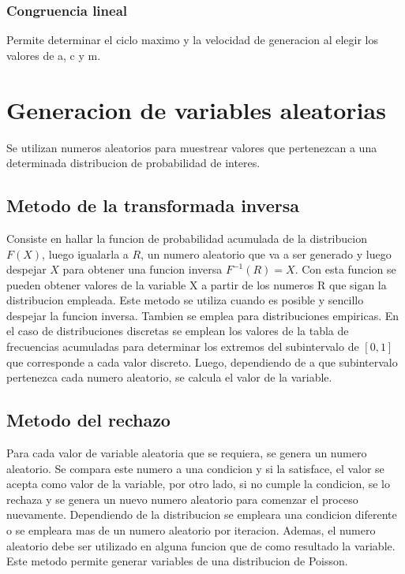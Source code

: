 \documentclass[a4paper]{article}
\begin{document}
\subsubsection*{Congruencia lineal} %
Permite determinar el ciclo maximo y la velocidad de generacion al elegir los valores de a, c y m.

\section{Generacion de variables aleatorias}
Se utilizan numeros aleatorios para muestrear valores que pertenezcan a una determinada distribucion de
probabilidad de interes.

\subsection*{Metodo de la transformada inversa}
Consiste en hallar la funcion de probabilidad acumulada de la distribucion $F(X)$, luego igualarla a $R$,
un numero aleatorio que va a ser generado y luego despejar $X$ para obtener una funcion inversa $F^{-1}(R) = X$.
Con esta funcion se pueden obtener valores de la variable X a partir de los numeros R que sigan la distribucion 
empleada. 
Este metodo se utiliza cuando es posible y sencillo despejar la funcion inversa. Tambien se emplea para distribuciones
empiricas.
En el caso de distribuciones discretas se emplean los valores de la tabla de frecuencias acumuladas para determinar 
los extremos del subintervalo de $[0,1]$ que corresponde a cada valor discreto. Luego, dependiendo de a que subintervalo
pertenezca cada numero aleatorio, se calcula el valor de la variable.

\subsection*{Metodo del rechazo}
Para cada valor de variable aleatoria que se requiera, se genera un numero aleatorio. Se compara este numero a una condicion
y si la satisface, el valor se acepta como valor de la variable, por otro lado, si no cumple la condicion, se lo rechaza y
se genera un nuevo numero aleatorio para comenzar el proceso nuevamente. Dependiendo de la distribucion se empleara una 
condicion diferente o se empleara mas de un numero aleatorio por iteracion. Ademas, el numero aleatorio debe ser utilizado 
en alguna funcion que de como resultado la variable.
Este metodo permite generar variables de una distribucion de Poisson.
\end{document}
